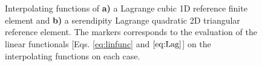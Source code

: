 \begin{figure}[t!]
    \hspace*{-.5\textwidth}
    \vspace*{7.5em}%
     \begin{subfigure}{\textwidth}\caption{ }\label{fig:ExampleElements:a}\end{subfigure}\\
    \hspace*{-.7\textwidth}
     \begin{subfigure}{\textwidth}\caption{ }\label{fig:ExampleElements:b}\end{subfigure}
     \vspace*{-11.5em}\\
    \centering
    \scriptsize
    \def\svgwidth{.9\textwidth}
\caption[Example of interpolating functions for 1D and 2D finite element]{Interpolating functions of \textbf{a)} a Lagrange cubic 1D reference finite element and \textbf{b)} a serendipity Lagrange quadratic 2D triangular reference element. The markers corresponds to the evaluation of the linear functionals [Eqs. \eqref{eq:linfunc} and $\eqref{eq:Lag}$] on the interpolating functions on each case.}
\label{fig:ExampleElements}
\end{figure}
